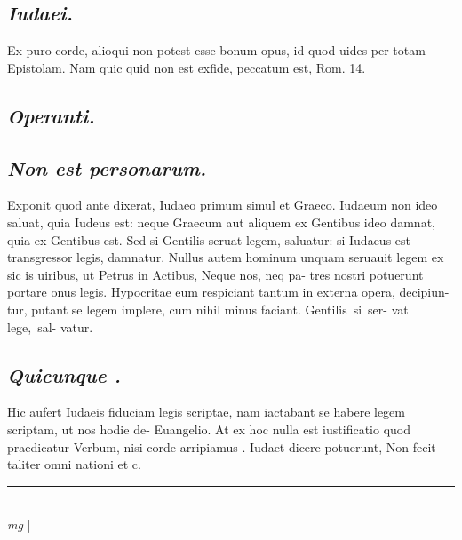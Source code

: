 \documentclass{article}
\begin{document}
\begin{pages}
\subsection*{\textit{Iudaei. }}\pstart Ex puro corde, alioqui non potest esse bonum opus, id quod uides per totam Epistolam. Nam quic quid non est exfide, peccatum est, Rom. 14.   \pend
{}
{}
\subsection*{\textit{Operanti. }}
{}
\subsection*{\textit{Non est personarum. }}\pstart Exponit quod ante dixerat, Iudaeo primum simul et Graeco. Iudaeum non ideo saluat, quia Iudeus est: neque Graecum aut aliquem ex Gentibus ideo damnat, quia ex Gentibus est. Sed si Gentilis seruat legem, saluatur: si Iudaeus est transgressor legis, damnatur.  Nullus autem hominum unquam seruauit legem ex sic is uiribus, ut Petrus in Actibus, Neque nos, neq pa- tres nostri potuerunt portare onus legis. Hypocritae eum respiciant tantum in externa opera, decipiun- tur, putant se legem implere, cum nihil minus faciant.  Gentilis si ser- vat lege, sal- vatur.   \pend
{}
{}
\subsection*{\textit{Quicunque . }}\pstart Hic aufert Iudaeis fiduciam legis scriptae, nam iactabant se habere legem scriptam, ut nos hodie de- Euangelio. At ex hoc nulla est iustificatio quod praedicatur Verbum, nisi corde arripiamus . Iudaet dicere potuerunt, Non fecit taliter omni nationi et c.   \pend
\vspace{0.5cm}\noindent
\vspace{0.2cm}\rule{1cm}{0.2pt}\\ 
\hspace{0.2cm}\textit{mg}
\footnotesize 
\normalsize| 

\end{pages}
\end{document}
